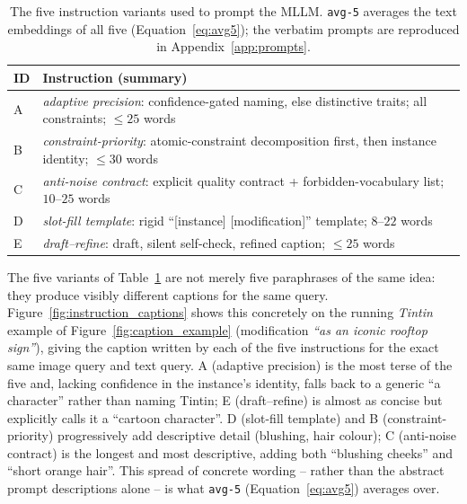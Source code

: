 \begin{table}[h!]
\centering
\begin{tabular}{l l}
\toprule
ID & Instruction (summary) \\ \midrule
\textsc{A} & \emph{adaptive precision}: confidence-gated naming, else distinctive traits; all constraints; $\le 25$ words \\
\textsc{B} & \emph{constraint-priority}: atomic-constraint decomposition first, then instance identity; $\le 30$ words \\
\textsc{C} & \emph{anti-noise contract}: explicit quality contract + forbidden-vocabulary list; $10$--$25$ words \\
\textsc{D} & \emph{slot-fill template}: rigid ``[instance] [modification]'' template; $8$--$22$ words \\
\textsc{E} & \emph{draft--refine}: draft, silent self-check, refined caption; $\le 25$ words \\
\bottomrule
\end{tabular}
\caption[Caption-generation instruction variants.]{The five instruction
variants used to prompt the MLLM. \texttt{avg-5} averages the text embeddings of
all five (Equation~\eqref{eq:avg5}); the verbatim prompts are reproduced in
Appendix~\ref{app:prompts}.\label{tab:instructions}}
\end{table}

The five variants of Table~\ref{tab:instructions} are not merely five
paraphrases of the same idea: they produce visibly different captions for the
same query. Figure~\ref{fig:instruction_captions} shows this concretely on the
running \emph{Tintin} example of Figure~\ref{fig:caption_example} (modification
\emph{``as an iconic rooftop sign''}), giving the caption written by each of
the five instructions for the exact same image query and text query.
\textsc{A} (adaptive precision) is the most terse of the five and, lacking
confidence in the instance's identity, falls back to a generic ``a
character'' rather than naming Tintin; \textsc{E} (draft--refine) is almost
as concise but explicitly calls it a ``cartoon character''. \textsc{D}
(slot-fill template) and \textsc{B} (constraint-priority) progressively add
descriptive detail (blushing, hair colour); \textsc{C} (anti-noise contract)
is the longest and most descriptive, adding both ``blushing cheeks'' and
``short orange hair''. This spread of concrete wording -- rather than the
abstract prompt descriptions alone -- is what \texttt{avg-5}
(Equation~\eqref{eq:avg5}) averages over.

